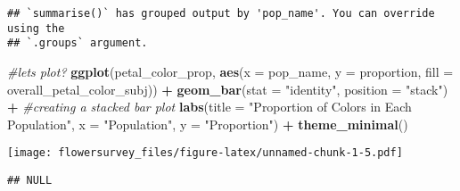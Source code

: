 \documentclass[
]{article}
\newenvironment{Shaded}{\begin{snugshade}}{\end{snugshade}}
\newcommand{\AttributeTok}[1]{\textcolor[rgb]{0.13,0.29,0.53}{#1}}
\newcommand{\CommentTok}[1]{\textcolor[rgb]{0.56,0.35,0.01}{\textit{#1}}}
\newcommand{\DecValTok}[1]{\textcolor[rgb]{0.00,0.00,0.81}{#1}}
\newcommand{\DocumentationTok}[1]{\textcolor[rgb]{0.56,0.35,0.01}{\textbf{\textit{#1}}}}
\newcommand{\FunctionTok}[1]{\textcolor[rgb]{0.13,0.29,0.53}{\textbf{#1}}}
\newcommand{\NormalTok}[1]{#1}
\newcommand{\OtherTok}[1]{\textcolor[rgb]{0.56,0.35,0.01}{#1}}
\newcommand{\SpecialCharTok}[1]{\textcolor[rgb]{0.81,0.36,0.00}{\textbf{#1}}}
\newcommand{\StringTok}[1]{\textcolor[rgb]{0.31,0.60,0.02}{#1}}
\begin{document}
\begin{verbatim}
## `summarise()` has grouped output by 'pop_name'. You can override using the
## `.groups` argument.
\end{verbatim}

\begin{Shaded}
\begin{Highlighting}[]
\CommentTok{\#let\textquotesingle{}s plot?}
\FunctionTok{ggplot}\NormalTok{(petal\_color\_prop, }\FunctionTok{aes}\NormalTok{(}\AttributeTok{x =}\NormalTok{ pop\_name, }\AttributeTok{y =}\NormalTok{ proportion, }\AttributeTok{fill =}\NormalTok{ overall\_petal\_color\_subj)) }\SpecialCharTok{+}
  \FunctionTok{geom\_bar}\NormalTok{(}\AttributeTok{stat =} \StringTok{"identity"}\NormalTok{, }\AttributeTok{position =} \StringTok{"stack"}\NormalTok{) }\SpecialCharTok{+} \CommentTok{\#creating a stacked bar plot}
  \FunctionTok{labs}\NormalTok{(}\AttributeTok{title =} \StringTok{"Proportion of Colors in Each Population"}\NormalTok{,}
       \AttributeTok{x =} \StringTok{"Population"}\NormalTok{,}
       \AttributeTok{y =} \StringTok{"Proportion"}\NormalTok{) }\SpecialCharTok{+}
  \FunctionTok{theme\_minimal}\NormalTok{()}
\end{Highlighting}
\end{Shaded}

\texttt{[image: flowersurvey\_files/figure-latex/unnamed-chunk-1-5.pdf]}

\begin{Shaded}
\end{Shaded}

\begin{verbatim}
## NULL
\end{verbatim}
\end{document}

